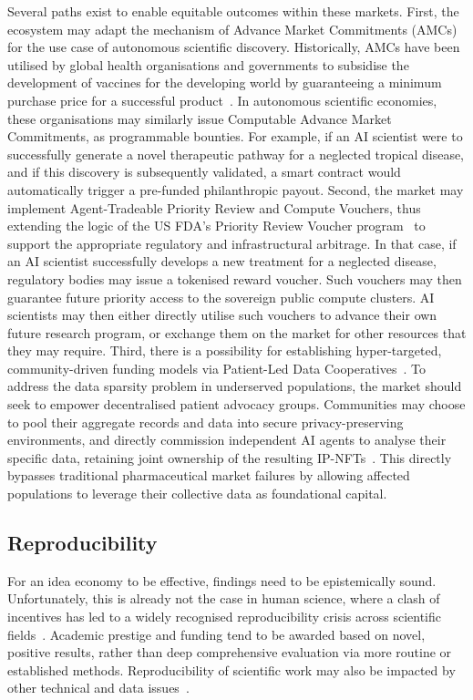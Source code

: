 \documentclass[11pt, a4paper, twocolumn, goog]{google}
\begin{document}
Several paths exist to enable equitable outcomes within these markets. First, the ecosystem may adapt the mechanism of Advance Market Commitments (AMCs) for the use case of autonomous scientific discovery. Historically, AMCs have been utilised by global health organisations and governments to subsidise the development of vaccines for the developing world by guaranteeing a minimum purchase price for a successful product~\citep{kremer2020advance}. In autonomous scientific economies, these organisations may similarly issue Computable Advance Market Commitments, as programmable bounties. For example, if an AI scientist were to successfully generate a novel therapeutic pathway for a neglected tropical disease, and if this discovery is subsequently validated, a smart contract would automatically trigger a pre-funded philanthropic payout. Second, the market may implement Agent-Tradeable Priority Review and Compute Vouchers, thus extending the logic of the US FDA’s Priority Review Voucher program~\citep{ridley2006developing} to support the appropriate regulatory and infrastructural arbitrage. In that case, if an AI scientist successfully develops a new treatment for a neglected disease, regulatory bodies may issue a tokenised reward voucher. Such vouchers may then guarantee future priority access to the sovereign public compute clusters. AI scientists may then either directly utilise such vouchers to advance their own future research program, or exchange them on the market for other resources that they may require. Third, there is a possibility for establishing hyper-targeted, community-driven funding models via Patient-Led Data Cooperatives~\citep{jansky2024patient}. To address the data sparsity problem in underserved populations, the market should seek to empower decentralised patient advocacy groups. Communities may choose to pool their aggregate records and data into secure privacy-preserving environments, and directly commission independent AI agents to analyse their specific data, retaining joint ownership of the resulting IP-NFTs~\citep{mendonca2025data, cunningham2026review}. This directly bypasses traditional pharmaceutical market failures by allowing affected populations to leverage their collective data as foundational capital.

\subsection{Reproducibility}
\label{sec:reproducibility}

For an idea economy to be effective, findings need to be epistemically sound. Unfortunately, this is already not the case in human science, where a clash of incentives has led to a widely recognised reproducibility crisis across scientific fields~\citep{ioannidis2005most, baker20161, nosek2015promoting, fanelli2018science, ioannidis2019most, doleman2019most, miyakawa2020no, bausell2021problem, szabo2025unreliable}. Academic prestige and funding tend to be awarded based on novel, positive results, rather than deep comprehensive evaluation via more routine or established methods. Reproducibility of scientific work may also be impacted by other technical and data issues~\citep{kapoor2023leakage}.
\end{document}

